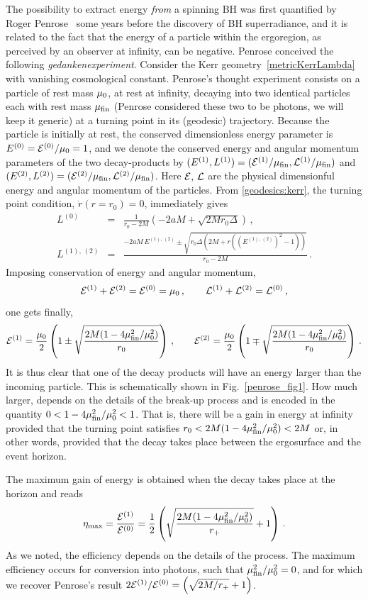 \documentclass[11pt]{article}
\newcommand{\be}{\begin{equation}}
\newcommand{\ee}{\end{equation}}
\def\beq{\begin{eqnarray}}
\def\eeq{\end{eqnarray}}
\numberwithin{equation}{section} %
\begin{document}
The possibility to extract energy \emph{from} a spinning BH was first quantified by Roger Penrose~\cite{Penrose:1969} some years before the discovery of BH superradiance, and it is related to the fact that the energy of a particle within the ergoregion, as perceived by an observer at infinity, can be negative. Penrose conceived the following \emph{gedankenexperiment}.
Consider the Kerr geometry~\eqref{metricKerrLambda} with vanishing cosmological constant.
Penrose's thought experiment consists on a particle of rest mass $\mu_{\rm 0}$, at rest at infinity, decaying into two identical particles
each with rest mass $\mu_{\rm fin}$ (Penrose considered these two to be photons, we will keep it generic) at a turning point in its (geodesic) trajectory. Because the particle is initially at rest, the conserved dimensionless energy parameter is $E^{(0)}={\cal E}^{(0)}/\mu_{\rm 0}=1$, and we denote the conserved energy and angular momentum parameters of the two decay-products by $(E^{(1)},L^{(1)})=({\cal E}^{(1)}/\mu_{\rm fin},{\cal L}^{(1)}/\mu_{\rm fin})$ and $(E^{(2)},L^{(2)})=({\cal E}^{(2)}/\mu_{\rm fin},{\cal L}^{(2)}/\mu_{\rm fin})$. Here ${\cal E},\,{\cal L}$ are the physical dimensionful energy and angular momentum of the particles.
From \eqref{geodesics:kerr}, the turning point condition, $\dot{r}(r=r_0)=0$, immediately gives
%
\beq
L^{(0)}&=&\frac{1}{r_0-2M}\left(-2aM+\sqrt{2Mr_0\Delta}\right)\,,\\
%
L^{(1), \,(2)}&=&\frac{- 2aM\, E^{(1),\,(2)}\pm\sqrt{r_0\Delta\left(2M+r(\left(E^{(1),\,(2)}\right)^2-1)\right)}}{r_0-2M}\,.
%
\eeq
%
Imposing conservation of energy and angular momentum,
%
\be
{\cal E}^{(1)}+{\cal E}^{(2)}={\cal E}^{(0)}=\mu_{0}\,,\qquad {\cal L}^{(1)}+{\cal L}^{(2)}={\cal L}^{(0)}\,,
\ee
%
one gets finally,
%
\be
{\cal E}^{(1)}=\frac{\mu_0}{2}\left(1\pm\sqrt{\frac{2M(1-4\mu_{\rm fin}^2/\mu_{0}^2)}{r_0}}\right)\,,\qquad {\cal E}^{(2)}=\frac{\mu_0}{2}\left(1\mp\sqrt{\frac{2M(1-4\mu_{\rm fin}^2/\mu_{0}^2)}{r_0}}\right)\,.
\ee
%
It is thus clear that one of the decay products will have an energy larger than the incoming particle. This is schematically shown in Fig.~\ref{penrose_fig1}.
How much larger, depends on the details of the break-up process and is encoded in the quantity $0<1-4\mu_{\rm fin}^2/\mu_{0}^2<1$.
That is, there will be a gain in energy at infinity provided that the turning point satisfies $r_0<2M(1-4\mu_{\rm fin}^2/\mu_{0}^2)<2M$ or, in other words, provided that the decay takes place between the ergosurface and the event horizon.


The maximum gain of energy is obtained when the decay takes place at the horizon and reads
%
\be
\eta_{\rm max}=\frac{{\cal E}^{(1)}}{{\cal E}^{(0)}}=\frac{1}{2}\left(\sqrt{\frac{2M(1-4\mu_{\rm fin}^2/\mu_{0}^2)}{r_+}}+1\right)\,.
\ee
%
As we noted, the efficiency depends on the details of the process. The maximum efficiency occurs for conversion into photons, such that $\mu_{\rm fin}^2/\mu_{0}^2=0$, and for which we recover Penrose's result $2{\cal E}^{(1)}/{\cal E}^{(0)}=\left(\sqrt{2M/r_+}+1\right)$.
\end{document}

